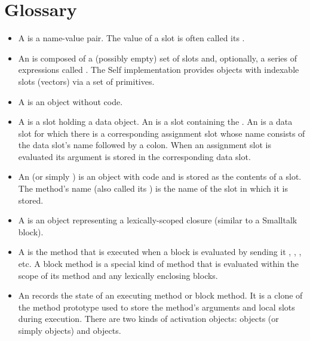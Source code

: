 \documentclass[letterpaper,10pt,english]{sphinxmanual}
\begin{document}
\section{Glossary}
\label{\detokenize{glossary:glossary}}\label{\detokenize{glossary::doc}}\label{\detokenize{glossary:id1}}\begin{itemize}
\item {} 
A  is a name-value pair. The value of a slot is often called its .

\item {} 
An  is composed of a (possibly empty) set of slots and, optionally, a series of expressions called . The Self implementation provides objects with indexable slots (vectors) via a set of primitives.

\item {} 
A  is an object without code.

\item {} 
A  is a slot holding a data object. An  is a slot containing the . An  is a data slot for which there is a corresponding assignment slot whose name consists of the data slot’s name followed by a colon. When an assignment slot is evaluated its argument is stored in the corresponding data slot.

\item {} 
An  (or simply ) is an object with code and is stored as the contents of a slot. The method’s name (also called its ) is the name of the slot in which it is stored.

\item {} 
A  is an object representing a lexically-scoped closure (similar to a Smalltalk block).

\item {} 
A  is the method that is executed when a block is evaluated by sending it , , , etc. A block method is a special kind of method that is evaluated within the scope of its method and any lexically enclosing blocks.

\item {} 
An  records the state of an executing method or block method. It is a clone of the method prototype used to store the method’s arguments and local slots during execution. There are two kinds of activation objects:  objects (or simply  objects) and  objects.


\end{itemize}
\end{document}
